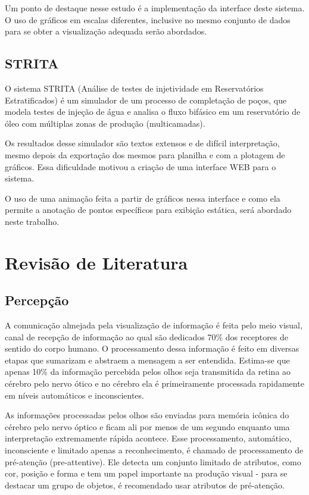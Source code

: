 \documentclass[]{article}
\begin{document}
Um ponto de destaque nesse estudo é a implementação da interface deste sistema. O uso de gráficos em escalas diferentes, inclusive no mesmo conjunto de dados para se obter a visualização adequada serão abordados.

\subsection{STRITA}

O sistema STRITA (Análise de testes de injetividade em Reservatórios Estratificados) é um simulador de um processo de completação de poços, que modela testes de injeção de água e analisa o fluxo bifásico em um reservatório de óleo com múltiplas zonas de produção (multicamadas).\cite{142746-MS}

Os resultados desse simulador são textos extensos e de difícil interpretação, mesmo depois da exportação dos mesmos para planilha e com a plotagem de gráficos. Essa dificuldade motivou a criação de uma interface WEB para o sistema.

O uso de uma animação feita a partir de gráficos nessa interface e como ela permite a anotação de pontos específicos para exibição estática, será abordado neste trabalho.

\section{Revisão de Literatura}

\subsection{Percepção} 
\label{sec:quant}

A comunicação almejada pela visualização de informação é feita pelo meio visual, canal de recepção de informação ao qual são dedicados 70\% dos receptores de sentido do corpo humano.\cite{few2012show}  O processamento dessa informação é feito em diversas etapas que sumarizam e abstraem a mensagem a ser entendida. Estima-se que apenas 10\% da informação percebida pelos olhos seja transmitida da retina ao cérebro pelo nervo ótico e no cérebro ela é primeiramente processada rapidamente em níveis automáticos e inconscientes. \cite{Ward:2010:IDV:1893097}

As informações processadas pelos olhos são enviadas para memória icônica do cérebro pelo nervo óptico e ficam ali por menos de um segundo enquanto uma interpretação extremamente rápida acontece. Esse processamento, automático, inconsciente e limitado apenas a reconhecimento, é chamado de processamento de pré-atenção (pre-attentive). Ele detecta um conjunto limitado de atributos, como cor, posição e forma e tem um papel importante na produção visual - para se destacar um grupo de objetos, é recomendado usar atributos de pré-atenção. \cite{journals/tvcg/HealeyKRMA08}
\end{document}
